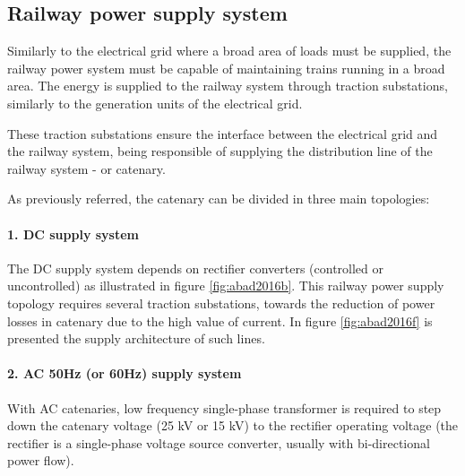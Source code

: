 \subsection{Railway power supply system}

Similarly to the electrical grid where a broad area of loads must be supplied, the railway power system must be capable of maintaining trains running in a broad area. The energy is supplied to the railway system through traction substations, similarly to the generation units of the electrical grid.

These traction substations ensure the interface between the electrical grid and the railway system, being responsible of supplying the distribution line of the railway system - or catenary.

As previously referred, the catenary can be divided in three main topologies:

%	
%	
%	
%

\paragraph{1. DC supply system\\}

The DC supply system depends on rectifier converters (controlled or uncontrolled) as illustrated in figure \ref{fig:abad2016b}. This railway power supply topology requires several traction substations, towards the reduction of power losses in catenary due to the high value of current. In figure \ref{fig:abad2016f} is presented the supply architecture of such lines.

\paragraph{2. AC 50Hz (or 60Hz) supply system\\}

With AC catenaries, low frequency single-phase transformer is required to step down the catenary voltage (25 kV or 15 kV) to the rectifier operating voltage (the rectifier is a single-phase voltage source converter, usually with bi-directional power flow).

